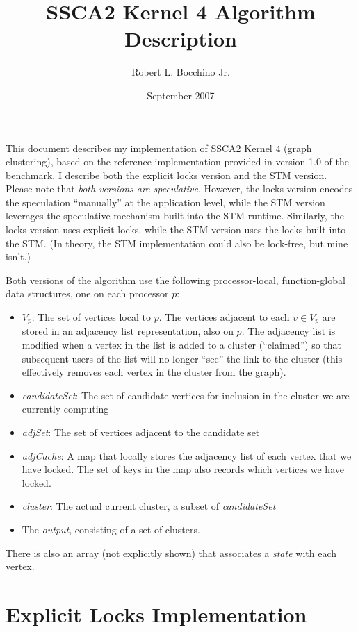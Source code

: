 \documentclass[10pt]{article}
\title{\bfseries{SSCA2 Kernel 4 Algorithm Description}}
\author{Robert L. Bocchino Jr.}
\date{September 2007}
\begin{document}
\begin{sloppypar}

\maketitle

This document describes my implementation of SSCA2 Kernel 4 (graph
clustering), based on the reference implementation provided in version
1.0 of the benchmark.  I describe both the explicit locks version and
the STM version.  Please note that \emph{both versions are
speculative}.  However, the locks version encodes the speculation
``manually'' at the application level, while the STM version leverages
the speculative mechanism built into the STM runtime.  Similarly, the
locks version uses explicit locks, while the STM version uses the
locks built into the STM.  (In theory, the STM implementation could
also be lock-free, but mine isn't.)

Both versions of the algorithm use the following processor-local,
function-global data structures, one on each processor $p$:
\begin{itemize}
\item $V_p$:  The set of vertices local to $p$.  The vertices adjacent
  to each $v \in V_p$ are stored in an adjacency list representation,
  also on $p$.  The adjacency list is modified when a vertex in the
  list is added to a cluster (``claimed'') so that subsequent users of
  the list will no longer ``see'' the link to the cluster (this
  effectively removes each vertex in the cluster from the graph).
\item \emph{candidateSet}:  The set of candidate vertices for
  inclusion in the cluster we are currently computing
\item \emph{adjSet}:  The set of vertices adjacent to the candidate
  set
\item \emph{adjCache}: A map that locally stores the adjacency list of
  each vertex that we have locked.  The set of keys in the map also
  records which vertices we have locked.
\item \emph{cluster}: The actual current cluster, a subset of
\emph{candidateSet}
\item The \emph{output}, consisting of a set of clusters.
\end{itemize}
There is also an array (not explicitly shown) that associates a
\emph{state} with each vertex.  

\section{Explicit Locks Implementation}


\end{sloppypar}
\end{document}
